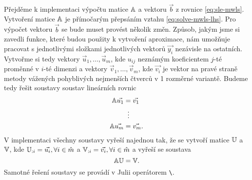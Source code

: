 Přejděme k implementaci výpočtu matice $\mathbb{A}$ a vektoru $\vec{b}$ z rovnice \ref{eq:sle-mwls}. Vytvoření matice $\mathbb{A}$ je přímočarým přepsáním vztahu \ref{eq:solve-mwls-lhs}. Pro výpočet vektoru $\vec{b}$ se bude muset provést několik změn. Způsob, jakým jsme si zavedli funkce, které budou použity k vytvoření aproximace, nám umožňuje pracovat s jednotlivými složkami jednotlivých vektorů $\vec{y_i}$ nezávisle na ostatních. Vytvořme si tedy vektory $\vec{u}_1, \ldots, \vec{u}_m$, kde $u_{ij}$ neznámým koeficientem $j$-té proměnné v $i$-té dimenzi a vektory $\vec{v}_1, \ldots, \vec{v}_m$, kde $\vec{v_i}$ je vektor na pravé straně metody vážených pohyblivých nejmenších čtverců v 1 rozměrné variantě. Budeme tedy řešit soustavy soustav lineárních rovnic
\begin{align}
  \mathbb{A}\vec{u_1} &= \vec{v_1}\notag\\
                  &\;\;\vdots\notag\\
  \mathbb{A}\vec{u_m} &= \vec{v_m}\notag.
\end{align}
V implementaci všechny soustavy vyřeší najednou tak, že se vytvoří matice $\mathbb{U}$ a $\mathbb{V}$, kde $\mathbb{U}_{:i} = \vec{u_i}, \forall i \in \hat m$ a $\mathbb{V}_{:i} = \vec{v_i}, \forall i \in \hat m$ a vyřeší se soustava
\begin{equation}
  \mathbb{A}\mathbb{U} = \mathbb{V}.
\end{equation}
Samotné řešení soustavy se provádí v Julii operátorem \texttt{\textbackslash}.
